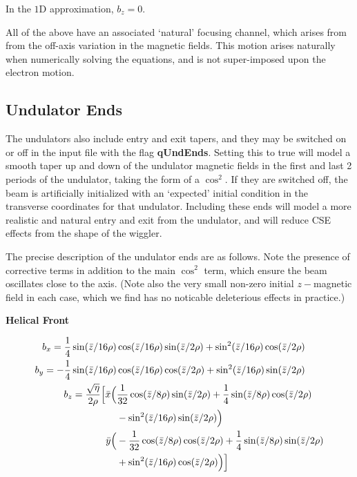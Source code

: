 \documentclass[12pt]{article}%
\begin{document}
In the $1$D approximation, $b_z = 0$. 

All of the above have an associated `natural' focusing channel, which arises from from the off-axis variation in the magnetic fields. This motion arises naturally when numerically solving the equations, and is not super-imposed upon the electron motion. 

\subsection{Undulator Ends}

The undulators also include entry and exit tapers, and they may be switched on or off in the input file with the flag {\bf qUndEnds}. Setting this to true will model a smooth taper up and down of the undulator magnetic fields in the first and last 2 periods of the undulator, taking the form of a $\cos^2$. If they are switched off, the beam is artificially initialized with an `expected' initial condition in the transverse coordinates for that undulator. Including these ends will model a more realistic and natural entry and exit from the undulator, and will reduce CSE effects from the shape of the wiggler.

The precise description of the undulator ends are as follows. Note the presence of corrective terms in addition to the main $\cos^2$ term, which ensure the beam oscillates close to the axis. (Note also the very small non-zero initial $z-$magnetic field in each case, which we find  has no noticable deleterious effects in practice.)

{\bf Helical Front}

\begin{align}
b_x  =  \frac{1}{4}\sin(\bar{z}/16\rho) & \cos(\bar{z}/16\rho)    \sin(\bar{z}/2\rho)   +   \sin^2(\bar{z} / 16\rho)  \cos(\bar{z}/2\rho)  \\  
b_y =  - \frac{1}{4}\sin(\bar{z}/16\rho) & \cos(\bar{z}/16\rho)    \cos(\bar{z}/2\rho)   +  \sin^2(\bar{z} / 16\rho)  \sin(\bar{z}/2\rho)\\
b_z = \frac{\sqrt{\eta}}{2\rho} \Bigl[   \bar{x}\Bigl(& \frac{1}{32}\cos( \bar{z}/8\rho )\sin(\bar{z}/2\rho) +
           \frac{1}{4}\sin(\bar{z}/8\rho)\cos(\bar{z}/2\rho) \nonumber  \\
           & - \sin^2(\bar{z}/16\rho)\sin(\bar{z}/2\rho) \Bigr) \nonumber \\
           \bar{y}\Bigl(& -\frac{1}{32}\cos( \bar{z}/8\rho )\cos(\bar{z}/2\rho) +\frac{1}{4}\sin(\bar{z}/8\rho)\sin(\bar{z}/2\rho) \nonumber  \\
           & + \sin^2(\bar{z}/16\rho)\cos(\bar{z}/2\rho) \Bigr)  \Bigr]  
\end{align}
\end{document}

